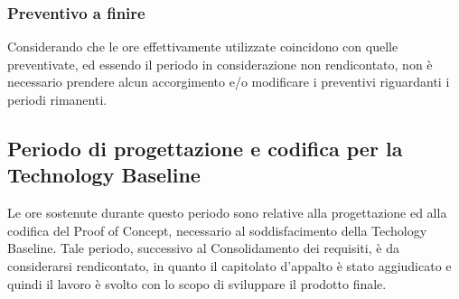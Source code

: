 \subsubsection{Preventivo a finire} 
Considerando che le ore effettivamente utilizzate coincidono con quelle preventivate, ed essendo il periodo in considerazione non rendicontato, non è necessario prendere alcun accorgimento e/o modificare i preventivi riguardanti i periodi rimanenti.

\subsection{Periodo di progettazione e codifica per la Technology Baseline}
Le ore sostenute durante questo periodo sono relative alla progettazione ed alla codifica del Proof of Concept\glo, necessario al soddisfacimento della Techology Baseline\glo. Tale periodo, successivo al Consolidamento dei requisiti, è da considerarsi rendicontato, in quanto il capitolato d'appalto è stato aggiudicato e quindi il lavoro è svolto con lo scopo di sviluppare il prodotto finale. 

